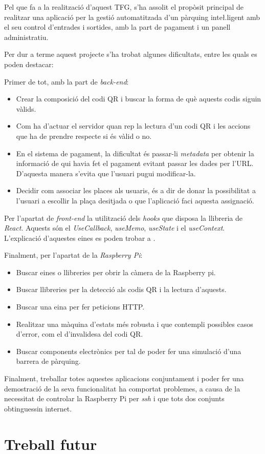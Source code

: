 Pel que fa a la realització d'aquest TFG, s'ha assolit el propòsit principal
de realitzar una aplicació per la gestió automatitzada d'un pàrquing
inte\l.ligent amb el seu control d'entrades i sortides, amb la part de pagament i un panell administratiu.

Per dur a terme aquest projecte s'ha trobat algunes dificultats, entre les quals es poden destacar:

Primer de tot, amb la part de \emph{back-end}:
\begin{itemize}
    \item Crear la composició del codi QR i buscar la forma de què aquests codis siguin vàlids.
    \item Com ha d'actuar el servidor quan rep la lectura d'un codi QR i les accions que ha de
    prendre respecte si és vàlid o no.
    \item En el sistema de pagament, la dificultat és passar-li \emph{metadata} per
    obtenir la informació de qui havia fet el pagament evitant passar les dades per l'URL. D'aquesta manera s'evita que
    l'usuari pugui modificar-la.
    \item Decidir com associar les places als usuaris, és a dir de donar la possibilitat a l'usuari a escollir la plaça
    desitjada o que l'aplicació faci aquesta assignació.
\end{itemize}

Per l'apartat de \emph{front-end} la utilització dels \emph{hooks} que disposa la llibreria
de \emph{React}. Aquests són el \emph{UseCallback}, \emph{useMemo}, \emph{useState} i el \emph{useContext}.
L'explicació d'aquestes eines es poden trobar a \autocite{hooks_react}.

Finalment, per l'apartat de la \emph{Raspberry Pi}:
\begin{itemize}
    \item Buscar eines o llibreries per obrir la càmera de la Raspberry pi.
    \item Buscar llibreries per la detecció als codis QR i la lectura d'aquests.
    \item Buscar una eina per fer peticions HTTP.
    \item Realitzar una màquina d'estats més robusta i que contempli possibles casos d'error, com el d'invalidesa del codi QR.
    \item Buscar components electrònics per tal de poder fer una simulació d'una barrera de pàrquing.
\end{itemize}

Finalment, treballar totes aquestes aplicacions conjuntament i poder fer una demostració de la seva funcionalitat
ha comportat problemes, a causa de la necessitat de controlar la Raspberry Pi per \emph{ssh} i que tots dos conjunts obtinguessin internet.

\section{Treball futur}
